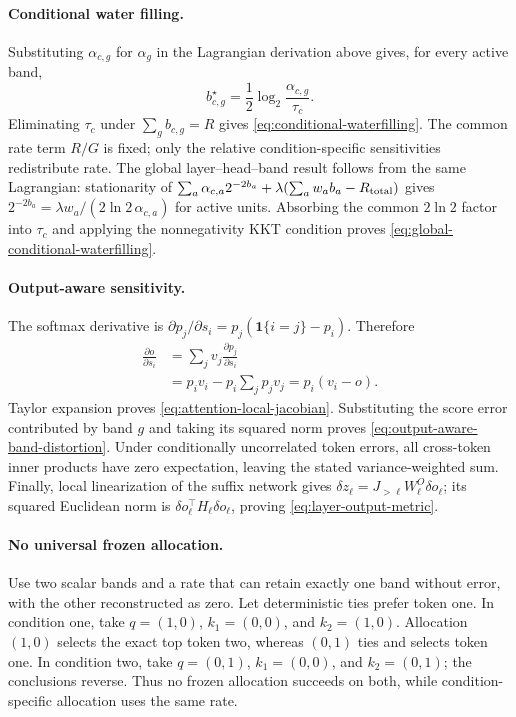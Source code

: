 \paragraph{Conditional water filling.}
Substituting $\alpha_{c,g}$ for $\alpha_g$ in the Lagrangian derivation above
gives, for every active band,
\begin{equation}
 b_{c,g}^\star=\frac12\log_2\frac{\alpha_{c,g}}{\tau_c}.
\end{equation}
Eliminating $\tau_c$ under $\sum_gb_{c,g}=R$ gives
\cref{eq:conditional-waterfilling}.  The common rate term $R/G$ is fixed;
only the relative condition-specific sensitivities redistribute rate.
The global layer--head--band result follows from the same Lagrangian:
stationarity of
$\sum_a\alpha_{c,a}2^{-2b_a}
+\lambda(\sum_aw_ab_a-R_{\rm total})$
gives
$2^{-2b_a}=\lambda w_a/(2\ln2\,\alpha_{c,a})$ for active units.
Absorbing the common $2\ln2$ factor into $\tau_c$ and applying the
nonnegativity KKT condition proves
\cref{eq:global-conditional-waterfilling}.

\paragraph{Output-aware sensitivity.}
The softmax derivative is
$\partial p_j/\partial s_i=p_j(\mathbf 1\{i=j\}-p_i)$.
Therefore
\begin{align}
 \frac{\partial o}{\partial s_i}
 &=
 \sum_jv_j\frac{\partial p_j}{\partial s_i}\\
 &=p_i v_i-p_i\sum_jp_jv_j
 =p_i(v_i-o).
\end{align}
Taylor expansion proves \cref{eq:attention-local-jacobian}.
Substituting the score error contributed by band $g$ and taking its squared
norm proves \cref{eq:output-aware-band-distortion}.  Under conditionally
uncorrelated token errors, all cross-token inner products have zero
expectation, leaving the stated variance-weighted sum.  Finally, local
linearization of the suffix network gives
$\delta z_\ell=J_{>\ell}W_\ell^O\delta o_\ell$; its squared Euclidean norm
is $\delta o_\ell^\top H_\ell\delta o_\ell$, proving
\cref{eq:layer-output-metric}.

\paragraph{No universal frozen allocation.}
Use two scalar bands and a rate that can retain exactly one band without
error, with the other reconstructed as zero.  Let deterministic ties prefer
token one.  In condition one, take $q=(1,0)$,
$k_1=(0,0)$, and $k_2=(1,0)$.  Allocation $(1,0)$ selects the exact top token
two, whereas $(0,1)$ ties and selects token one.  In condition two, take
$q=(0,1)$, $k_1=(0,0)$, and $k_2=(0,1)$; the conclusions reverse.  Thus no
frozen allocation succeeds on both, while condition-specific allocation
uses the same rate.

